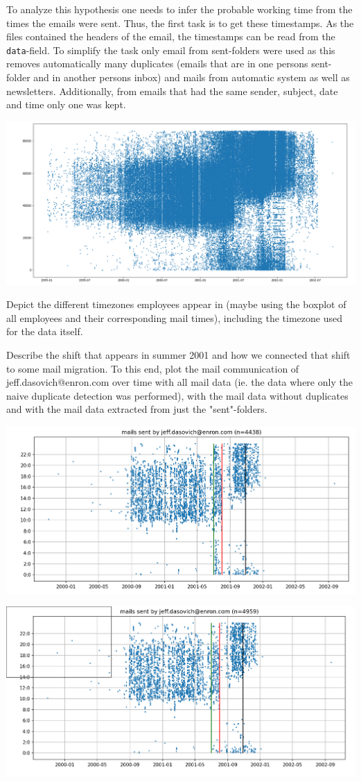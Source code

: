 \documentclass{article}
\begin{document}
To analyze this hypothesis one needs to infer the probable working time from the
times the emails were sent. Thus, the first task is to get these timestamps.
As the files contained the headers of the email, the timestamps can be read from
the \texttt{data}-field. To simplify the task only email from sent-folders were
used as this removes automatically many duplicates (emails that are in one
persons sent-folder and in another persons inbox) and mails from automatic
system as well as newsletters. Additionally, from emails that had the same
sender, subject, date and time only one was kept.

\begin{center}
  \includegraphics[width=0.7\linewidth]{tmp/plot_all_mail.png}
\end{center}

Depict the different timezones employees appear in (maybe using the boxplot of
all employees and their corresponding mail times), including the timezone used
for the data itself.

Describe the shift that appears in summer 2001
and how we connected that shift to some mail migration. To this end, plot the
mail communication of jeff.dasovich@enron.com over time with all mail data (ie.
the data where only the naive duplicate detection was performed), with the mail
data without duplicates and with the mail data extracted from just the
"sent"-folders.

\begin{center}
  \includegraphics[width=0.7\linewidth]{tmp/plot_jeff_all.png}
\end{center}
\begin{center}
  \includegraphics[width=0.7\linewidth]{tmp/plot_jeff_stripped.png}
\end{center}
\end{document}
